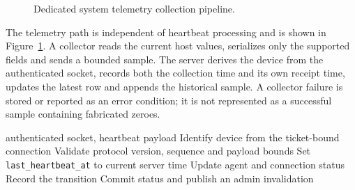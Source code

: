 \documentclass[12pt,a4paper]{report}
\begin{document}
\begin{figure}[H]
\centering
{}
\caption{Dedicated system telemetry collection pipeline.}
\label{fig:telemetry-collection-pipeline}
\end{figure}

The telemetry path is independent of heartbeat processing and is shown in
Figure~\ref{fig:telemetry-collection-pipeline}. A collector reads
the current host values, serializes only the supported fields and sends a
bounded sample. The server derives the device from the authenticated socket,
records both the collection time and its own receipt time, updates the latest
row and appends the historical sample. A collector failure is stored or
reported as an error condition; it is not represented as a successful sample
containing fabricated zeroes.

\begin{algorithm}[H]
\caption{Authenticated heartbeat processing}
\label{alg:heartbeat}
\begin{algorithmic}[1]
\Require authenticated socket, heartbeat payload
\State Identify device from the ticket-bound connection
\State Validate protocol version, sequence and payload bounds
\State Set \texttt{last\_heartbeat\_at} to current server time
\State Update agent and connection status
  \State Record the transition
\EndIf
\State Commit status and publish an admin invalidation
\end{algorithmic}
\end{algorithm}
\end{document}
